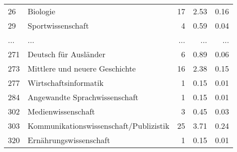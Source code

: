 \begin{longtable}{lXrrr}
        26 & \multicolumn{1}{X}{Biologie} & %
          \num{17} &
          \num[round-mode=places,round-precision=2]{2,53} &
          \num[round-mode=places,round-precision=2]{0,16} \\
        29 & \multicolumn{1}{X}{Sportwissenschaft} & %
          \num{4} &
          \num[round-mode=places,round-precision=2]{0,59} &
          \num[round-mode=places,round-precision=2]{0,04} \\
       ... & ... & ... & ... & ... \\
        271 & \multicolumn{1}{X}{Deutsch für Ausländer} & %
          \num{6} &
          \num[round-mode=places,round-precision=2]{0,89} &
          \num[round-mode=places,round-precision=2]{0,06} \\

        273 & \multicolumn{1}{X}{Mittlere und neuere Geschichte} & %
          \num{16} &
          \num[round-mode=places,round-precision=2]{2,38} &
          \num[round-mode=places,round-precision=2]{0,15} \\

        277 & \multicolumn{1}{X}{Wirtschaftsinformatik} & %
          \num{1} &
          \num[round-mode=places,round-precision=2]{0,15} &
          \num[round-mode=places,round-precision=2]{0,01} \\

        284 & \multicolumn{1}{X}{Angewandte Sprachwissenschaft} & %
          \num{1} &
          \num[round-mode=places,round-precision=2]{0,15} &
          \num[round-mode=places,round-precision=2]{0,01} \\

        302 & \multicolumn{1}{X}{Medienwissenschaft} & %
          \num{3} &
          \num[round-mode=places,round-precision=2]{0,45} &
          \num[round-mode=places,round-precision=2]{0,03} \\

        303 & \multicolumn{1}{X}{Kommunikationswissenschaft/Publizistik} & %
          \num{25} &
          \num[round-mode=places,round-precision=2]{3,71} &
          \num[round-mode=places,round-precision=2]{0,24} \\

        320 & \multicolumn{1}{X}{Ernährungswissenschaft} & %
          \num{1} &
          \num[round-mode=places,round-precision=2]{0,15} &
          \num[round-mode=places,round-precision=2]{0,01} \\


\end{longtable}
